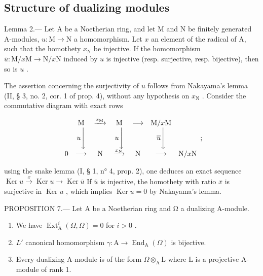 \subsection{Structure of dualizing modules}

Lemma 2.--- Let A be a Noetherian ring, and let M and N be finitely generated A-modules, \(u: \mathrm{M} \to \mathrm{N}\) a homomorphism. Let \(x\) an element of the radical of A, such that the homothety \(x_{\mathrm{N}}\) be injective. If the homomorphism \(\overline{u}: \mathrm{M}/x\mathrm{M} \to \mathrm{N}/x\mathrm{N}\) induced by \(u\) is injective (resp. surjective, resp. bijective), then so is \(u\) .

The assertion concerning the surjectivity of \(u\) follows from Nakayama's lemma (II, § 3, no. 2, cor. 1 of prop. 4), without any hypothesis on \(x_{\mathrm{N}}\) . Consider the commutative diagram with exact rows

\[
\begin{array}{c c c c c c c} & \mathrm{M} & \xrightarrow {x _ {\mathrm{M}}} & \mathrm{M} & \longrightarrow & \mathrm{M} / x \mathrm{M} \\ & u \Bigg \downarrow & & u \Bigg \downarrow & & \overline {{u}} \Bigg \downarrow \\ 0 & \longrightarrow & \mathrm{N} & \xrightarrow {x _ {\mathrm{N}}} & \mathrm{N} & \longrightarrow & \mathrm{N} / x \mathrm{N} \end{array} ;
\]

using the snake lemma (I, § 1, n° 4, prop. 2), one deduces an exact sequence \(\operatorname{Ker} u \xrightarrow{x} \operatorname{Ker} u \longrightarrow \operatorname{Ker} \overline{u}\) If \(\overline{u}\) is injective, the homothety with ratio \(x\) is surjective in \(\operatorname{Ker} u\) , which implies \(\operatorname{Ker} u = 0\) by Nakayama's lemma.

PROPOSITION 7.--- Let A be a Noetherian ring and Ω a dualizing A-module.

\begin{enumerate}
\def\labelenumi{\alph{enumi})}
\item
  We have \(\operatorname{Ext}_{\mathrm{A}}^{i}(\Omega, \Omega) = 0\) for \(i > 0\) .
\item
  \(L'\) canonical homomorphism \(\gamma : \mathrm{A} \to \operatorname{End}_{\mathrm{A}}(\Omega)\) is bijective.
\item
  Every dualizing A-module is of the form \(\Omega\otimes_{\mathrm{A}}\mathrm{L}\) where \(\mathrm{L}\) is a projective A-module of rank 1.
\end{enumerate}


